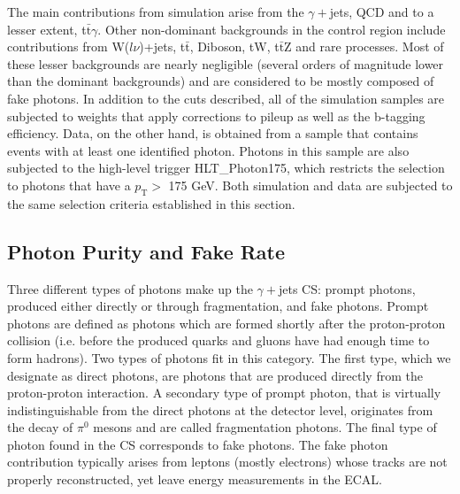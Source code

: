 The main contributions from simulation arise from the $\gamma+$jets, QCD and to a lesser extent, t$\bar{\text{t}}\gamma$. Other non-dominant backgrounds in the control region include contributions from W($l\nu$)+jets, t$\bar{\text{t}}$, Diboson, tW, t$\bar{\text{t}}$Z and rare processes. Most of these lesser backgrounds are nearly negligible (several orders of magnitude lower than the dominant backgrounds) and are considered to be mostly composed of fake photons. In addition to the cuts described, all of the simulation samples are subjected to weights that apply corrections to pileup as well as the b-tagging efficiency. Data, on the other hand, is obtained from a sample that contains events with at least one identified photon. Photons in this sample are also subjected to the high-level trigger HLT\_Photon175, which restricts the selection to photons that have a $p_\text{T} >$ 175 GeV. Both simulation and data are subjected to the same selection criteria established in this section. 

\subsection{Photon Purity and Fake Rate}\label{purity&fakerate}

Three different types of photons make up the $\gamma+$jets CS: prompt photons, produced either directly or through fragmentation, and fake photons. Prompt photons are defined as photons which are formed shortly after the proton-proton collision (i.e. before the produced quarks and gluons have had enough time to form hadrons). Two types of photons fit in this category. The first type, which we designate as direct photons, are photons that are produced directly from the proton-proton interaction\cite{promptPho}. A secondary type of prompt photon, that is virtually indistinguishable from the direct photons at the detector level, originates from the decay of $\pi^0$ mesons and are called fragmentation photons. The final type of photon found in the CS corresponds to fake photons. The fake photon contribution typically arises from leptons (mostly electrons) whose tracks are not properly reconstructed, yet leave energy measurements in the ECAL.

